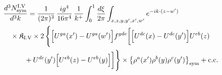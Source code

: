 \begingroup\small
\begin{align}\label{eq:H-I.V-3}
&\frac{d^{3}N^{\rm I.V}_{{\rm sym}}}{d^{3}k}=\frac{1}{(2\pi)^{3}}\, \frac{ig^{4}}{16\pi^{4}}\, \frac{1}{k^{+}} \int_{0}^{1}\frac{d\xi}{2\pi} \int_{x,z,y,y',x',w'}e^{-ik\cdot(z-w')}\notag\\
&\quad \times \mathfrak{K}_{\rm I.V} \times 2\, \Bigg\{\Big[U^{ga}(x')-U^{ga}(w')\Big]f^{gde}\bigg[\Big[U^{dc}(x)-U^{dc}(y')\Big]U^{eb}(z)\notag\\
&\quad\quad\quad +U^{dc}(y')\Big[U^{eb}(z)-U^{eb}(y)\Big]\bigg]\Bigg\} \times \big\{\rho^{a}(x')\rho^{b}(y)\rho^{c}(y')\big\}_{\rm sym} +{\rm c.c.}
\end{align}
\endgroup

